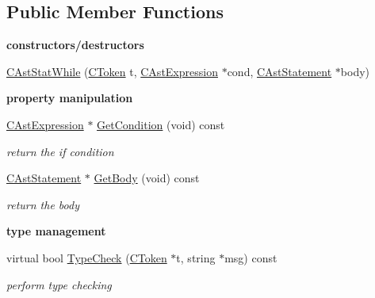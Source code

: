 \subsection*{Public Member Functions}
\begin{Indent}{\bf constructors/destructors}\par
\begin{DoxyCompactItemize}
\item 
\hyperlink{classCAstStatWhile_aef89ab0da75ad32525e9a65be6fbc77c}{C\-Ast\-Stat\-While} (\hyperlink{classCToken}{C\-Token} t, \hyperlink{classCAstExpression}{C\-Ast\-Expression} $\ast$cond, \hyperlink{classCAstStatement}{C\-Ast\-Statement} $\ast$body)
\end{DoxyCompactItemize}
\end{Indent}
\begin{Indent}{\bf property manipulation}\par
\begin{DoxyCompactItemize}
\item 
\hyperlink{classCAstExpression}{C\-Ast\-Expression} $\ast$ \hyperlink{classCAstStatWhile_a704ec78f7588bc0755b192145db22971}{Get\-Condition} (void) const 
\begin{DoxyCompactList}\small\item\em return the if condition \end{DoxyCompactList}\item 
\hyperlink{classCAstStatement}{C\-Ast\-Statement} $\ast$ \hyperlink{classCAstStatWhile_a9034a98c20ac8bfe1b7df383203c718a}{Get\-Body} (void) const 
\begin{DoxyCompactList}\small\item\em return the body \end{DoxyCompactList}\end{DoxyCompactItemize}
\end{Indent}
\begin{Indent}{\bf type management}\par
\begin{DoxyCompactItemize}
\item 
virtual bool \hyperlink{classCAstStatWhile_aa912c2107ee05c485cb49d9da10fd34f}{Type\-Check} (\hyperlink{classCToken}{C\-Token} $\ast$t, string $\ast$msg) const 
\begin{DoxyCompactList}\small\item\em perform type checking \end{DoxyCompactList}\end{DoxyCompactItemize}
\end{Indent}
